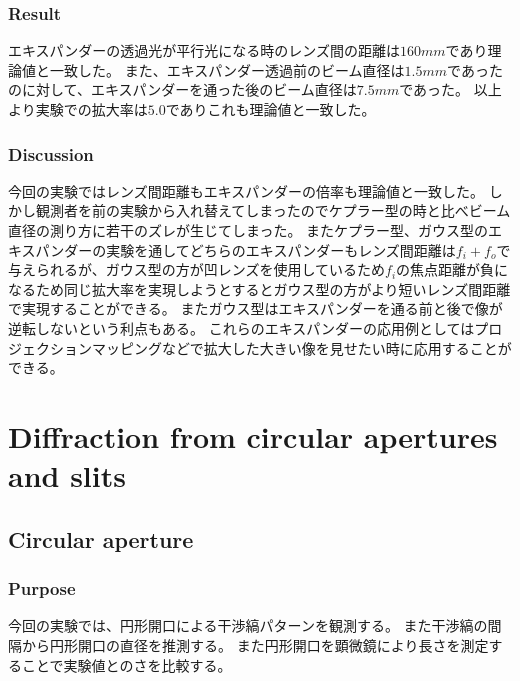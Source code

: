 \documentclass[11pt, a4paper]{jsarticle}
\begin{document}
\subsubsection{Result}
エキスパンダーの透過光が平行光になる時のレンズ間の距離は$160mm$であり理論値と一致した。
また、エキスパンダー透過前のビーム直径は$1.5mm$であったのに対して、エキスパンダーを通った後のビーム直径は$7.5mm$であった。
以上より実験での拡大率は$5.0$でありこれも理論値と一致した。
\subsubsection{Discussion}
今回の実験ではレンズ間距離もエキスパンダーの倍率も理論値と一致した。
しかし観測者を前の実験から入れ替えてしまったのでケプラー型の時と比べビーム直径の測り方に若干のズレが生じてしまった。
またケプラー型、ガウス型のエキスパンダーの実験を通してどちらのエキスパンダーもレンズ間距離は$f_i + f_o$で与えられるが、ガウス型の方が凹レンズを使用しているため$f_i$の焦点距離が負になるため同じ拡大率を実現しようとするとガウス型の方がより短いレンズ間距離で実現することができる。
またガウス型はエキスパンダーを通る前と後で像が逆転しないという利点もある。
これらのエキスパンダーの応用例としてはプロジェクションマッピングなどで拡大した大きい像を見せたい時に応用することができる。

\section{Diffraction from circular apertures and slits}
\subsection{Circular aperture}
\subsubsection{Purpose}
今回の実験では、円形開口による干渉縞パターンを観測する。
また干渉縞の間隔から円形開口の直径を推測する。
また円形開口を顕微鏡により長さを測定することで実験値とのさを比較する。
\end{document}
